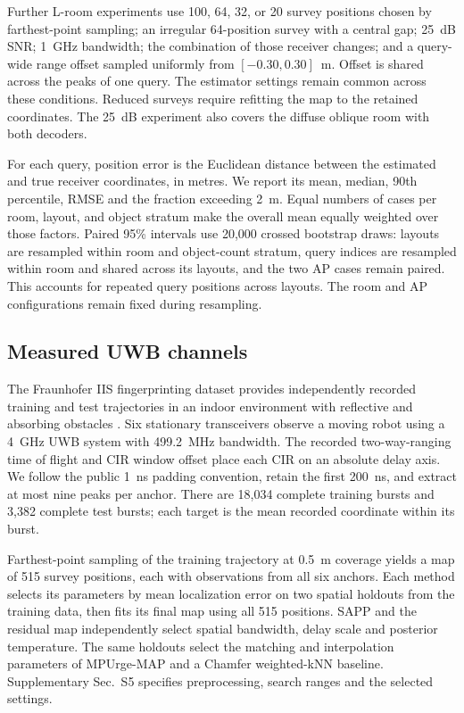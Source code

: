 \documentclass[conference]{IEEEtran}
\begin{document}
Further L-room experiments use 100, 64, 32, or 20 survey positions chosen by farthest-point sampling; an irregular 64-position survey with a central gap; 25~dB SNR; 1~GHz bandwidth; the combination of those receiver changes; and a query-wide range offset sampled uniformly from \([-0.30,0.30]\)~m. Offset is shared across the peaks of one query. The estimator settings remain common across these conditions. Reduced surveys require refitting the map to the retained coordinates. The 25~dB experiment also covers the diffuse oblique room with both decoders.

For each query, position error is the Euclidean distance between the estimated and true receiver coordinates, in metres. We report its mean, median, 90th percentile, RMSE and the fraction exceeding 2~m. Equal numbers of cases per room, layout, and object stratum make the overall mean equally weighted over those factors. Paired 95\% intervals use 20,000 crossed bootstrap draws: layouts are resampled within room and object-count stratum, query indices are resampled within room and shared across its layouts, and the two AP cases remain paired. This accounts for repeated query positions across layouts. The room and AP configurations remain fixed during resampling.

\subsection{Measured UWB channels}
The Fraunhofer IIS fingerprinting dataset provides independently recorded training and test trajectories in an indoor environment with reflective and absorbing obstacles \cite{fraunhoferuwb,stahlke2023charting}. Six stationary transceivers observe a moving robot using a 4~GHz UWB system with 499.2~MHz bandwidth. The recorded two-way-ranging time of flight and CIR window offset place each CIR on an absolute delay axis. We follow the public 1~ns padding convention, retain the first 200~ns, and extract at most nine peaks per anchor. There are 18,034 complete training bursts and 3,382 complete test bursts; each target is the mean recorded coordinate within its burst.

Farthest-point sampling of the training trajectory at 0.5~m coverage yields a map of 515 survey positions, each with observations from all six anchors. Each method selects its parameters by mean localization error on two spatial holdouts from the training data, then fits its final map using all 515 positions. SAPP and the residual map independently select spatial bandwidth, delay scale and posterior temperature. The same holdouts select the matching and interpolation parameters of MPUrge-MAP and a Chamfer weighted-kNN baseline. Supplementary Sec.~S5 specifies preprocessing, search ranges and the selected settings.
\end{document}
